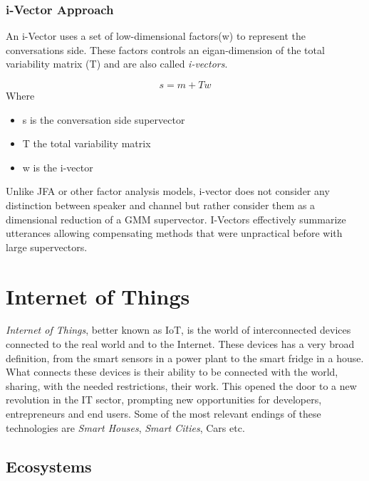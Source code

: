 \subsubsection{i-Vector Approach}

An i-Vector uses a set of low-dimensional factors(w) to represent the conversations
side. These factors controls an eigan-dimension of the total variability matrix (T) and
are also called \textit{i-vectors}.

\begin{equation}
    s = m + Tw
\end{equation}
Where
\begin{itemize}
    \item s is the conversation side supervector
    \item T the total variability matrix
    \item w is the i-vector
\end{itemize}
Unlike JFA or other factor analysis models, i-vector does not consider any
distinction between speaker and channel but rather consider them as a dimensional
reduction of a GMM supervector. I-Vectors effectively summarize utterances allowing
compensating methods that were unpractical before with large supervectors.

\section{Internet of Things}

\textit{Internet of Things}, better known as IoT, is the world of interconnected devices
connected to the real world and to the Internet. These devices has a very
broad definition, from the smart sensors in a power plant to the smart fridge in
a house. What connects these devices is their ability to be connected with the world,
sharing, with the needed restrictions, their work. This opened the door to a new
revolution in the IT sector, prompting new opportunities for developers, entrepreneurs
and end users. Some of the most relevant endings of these technologies are \textit{Smart Houses},
\textit{Smart Cities}, Cars etc. %

\subsection{Ecosystems}

